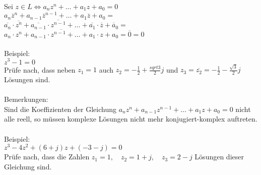 Sei $z \in L \Leftrightarrow a_n z^n + \dots + a_1 z + a_0 = 0$\\
$a_n \overline{z}^n + a_{n-1} \overline{z}^{n-1} + \dots + a_1 \overline{z} + a_0 = $\\
$\overline{a_n} \cdot \overline{z^n} + \overline{a_{n-1}} \cdot \overline{z^{n-1}} + \dots + \overline{a_1} \cdot \overline{z} + \overline a_0 = $\\
$\overline{a_n \cdot z^n + a_{n-1} \cdot z^{n-1} + \dots + a_1 \cdot z + a_0} = \overline{0} = 0$\\\\
Beispiel: \\
$z^3 - 1 = 0$ \\
Prüfe nach, dass neben $z_1 = 1$ auch $z_2 = -\frac{1}{2} + \frac{sqrt{3}}{2} j$ und $z_3 = \overline{z_2} = -\frac{1}{2} - \frac{\sqrt{3}}{2} j$ Lösungen sind. \\\\
Bemerkungen: \\
Sind die Koeffizienten der Gleichung $a_n z^n + a_{n-1} z^{n-1} + \dots + a_1 z + a_0 = 0$ nicht alle reell, so müssen komplexe Lösungen nicht mehr konjugiert-komplex auftreten. \\\\
Beispiel: \\
$z^3 - 4 z^2 + (6 + j) z + (-3 - j) = 0$\\
Prüfe nach, dass die Zahlen $z_1 = 1, \quad z_2 = 1 + j, \quad z_3 = 2 - j$ Lösungen dieser Gleichung sind. 